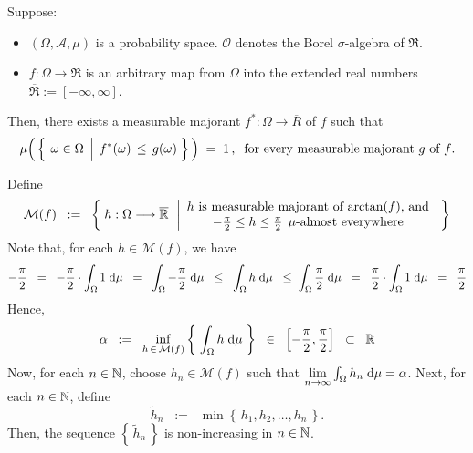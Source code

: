 \begin{theorem}
\mbox{}\vskip 0.1cm
\noindent
Suppose:
\begin{itemize}
\item
	$(\Omega,\mathcal{A},\mu)$ is a probability space.
	$\mathcal{O}$ denotes the Borel $\sigma$-algebra of $\Re$.
\item
	$f : \Omega \longrightarrow \overline{\Re}$
	is an arbitrary map from $\Omega$ into the extended real numbers
	$\overline{\Re} := [-\infty,\infty]$.
\end{itemize}
Then, there exists a measurable majorant $f^{*} : \Omega \longrightarrow \overline{R}$ of $f$ such that
\begin{equation*}
\mu\!\left(\,\left\{\;\left.\omega\overset{{\color{white}.}}{\in}\Omega\;\,\right\vert\; f^{*}(\omega) \,\leq\, g(\omega)\;\right\}\,\right)
\;=\;1\,,\;\;
\textnormal{for every measurable majorant $g$ of $f$}.
\end{equation*}
\end{theorem}
\proof
Define
\begin{equation*}
\mathcal{M}(f)
\;\; := \;\;
	\left\{\;
		h : \Omega \longrightarrow \overline{\Re}
	\;\,\left\vert
		\begin{array}{c}
		\textnormal{$h$ is measurable majorant of $\arctan(f)$, and}
		\\
		-\frac{\pi}{2} \leq h \leq \frac{\pi}{2} \;\, \mu\textnormal{-almost everywhere}
		\end{array}
	\right.
	\;\right\}
\end{equation*}
Note that, for each $h \in \mathcal{M}(f)$, we have
\begin{equation*}
-\dfrac{\pi}{2}
\;\;=\;\; -\dfrac{\pi}{2} \cdot \int_{\Omega} 1\;\d\mu
\;\;=\;\; \int_{\Omega} -\dfrac{\pi}{2} \;\d\mu
\;\;\leq\;\; \int_{\Omega} h \;\d\mu
\;\;\leq\; \int_{\Omega} \dfrac{\pi}{2} \;\d\mu
\;\;=\;\; \dfrac{\pi}{2} \cdot \int_{\Omega} 1\;\d\mu
\;\;=\;\; \dfrac{\pi}{2}
\end{equation*}
Hence,
\begin{equation*}
\alpha
\;\; := \;\; \underset{h\,\in\,\mathcal{M}(f)}{\inf}\left\{\;\int_{\Omega}h\;\d\mu\;\right\}
\;\;\in\;\; \left[-\dfrac{\pi}{2},\dfrac{\pi}{2}\right]
\;\;\subset\;\; \Re
\end{equation*}
Now, for each $n \in \N$, choose $h_{n} \in \mathcal{M}(f)$ such that
$\underset{n\rightarrow\infty}{\lim}\int_{\Omega}h_{n}\;\d\mu = \alpha$.
Next, for each $n \in \N$, define
\begin{equation*}
\widetilde{h}_{n} \;\; := \;\; \min\!\left\{\,h_{1},h_{2},\ldots,h_{n}\,\right\}.
\end{equation*}
Then, the sequence $\left\{\,\widetilde{h}_{n}\,\right\}$ is non-increasing in $n \in \N$.

